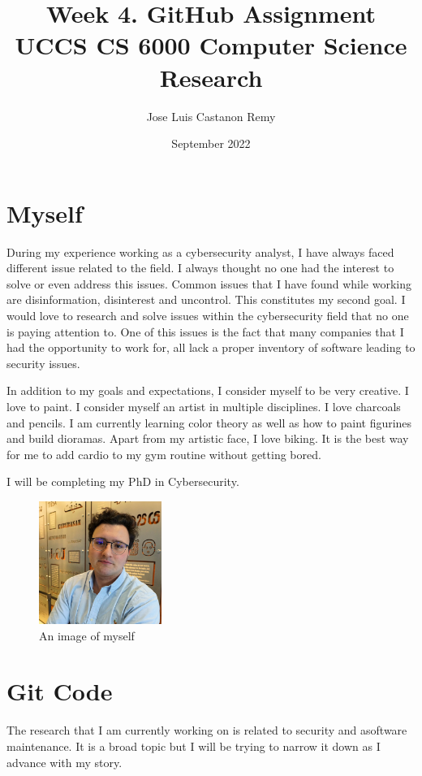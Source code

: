 \documentclass[article]{IEEEtran}
\title{Week 4. GitHub Assignment \\
\large UCCS CS 6000 Computer Science Research}
\author{Jose Luis Castanon Remy}
\date{September 2022}
\begin{document}
\maketitle

\section{Myself}

During my experience working as a cybersecurity analyst, I have always faced different issue related to the field. I always thought no one had the interest to solve or even address this issues. Common issues that I have found while working are disinformation, disinterest and uncontrol. This constitutes my second goal. I would love to research and solve issues within the cybersecurity field that no one is paying attention to. One of this issues is the fact that many companies that I had the opportunity to work for, all lack a proper inventory of software leading to security issues.



In addition to my goals and expectations, I consider myself to be very creative. I love to paint. I consider myself an artist in multiple disciplines. I love charcoals and pencils. I am currently learning color theory as well as how to paint figurines and build dioramas. Apart from my artistic face, I love biking. It is the best way for me to add cardio to my gym routine without getting bored.

I will be completing my PhD in Cybersecurity.


\begin{figure}[htp]
    \centering
    \includegraphics[width=4cm]{UCCSProfileIMG.jpg}
    \caption{An image of myself}
    \label{fig:myself}
\end{figure}


\section{Git Code}
The research that I am currently working on is related to security and asoftware maintenance. It is a broad topic but I will be trying to narrow it down as I advance with my story.
\end{document}
